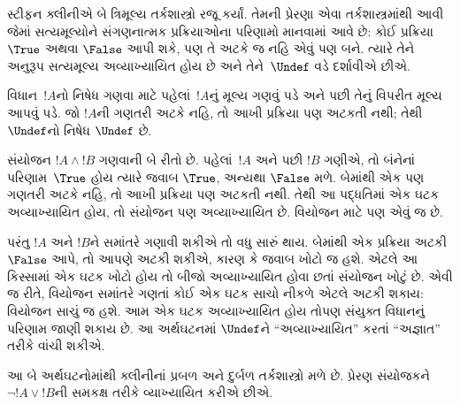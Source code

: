 \label{guunit:OLP-0395}


સ્ટીફન ક્લીનીએ બે ત્રિમૂલ્ય તર્કશાસ્ત્રો રજૂ કર્યાં. તેમની પ્રેરણા
એવા તર્કશાસ્ત્રમાંથી આવી જેમાં સત્યમૂલ્યોને સંગણનાત્મક પ્રક્રિયાઓના
પરિણામો માનવામાં આવે છે: કોઈ પ્રક્રિયા $\True$ અથવા $\False$ આપી
શકે, પણ તે અટકે જ નહિ એવું પણ બને. ત્યારે તેને અનુરૂપ સત્યમૂલ્ય
અવ્યાખ્યાયિત હોય છે અને તેને~$\Undef$ વડે દર્શાવીએ છીએ.

વિધાન~$!A$નો નિષેધ ગણવા માટે પહેલાં~$!A$નું મૂલ્ય ગણવું પડે અને
પછી તેનું વિપરીત મૂલ્ય આપવું પડે. જો $!A$ની ગણતરી અટકે નહિ, તો
આખી પ્રક્રિયા પણ અટકતી નથી; તેથી $\Undef$નો નિષેધ $\Undef$ છે.

સંયોજન $!A \land !B$ ગણવાની બે રીતો છે. પહેલાં~$!A$ અને પછી
$!B$ ગણીએ, તો બંનેનાં પરિણામ~$\True$ હોય ત્યારે જવાબ $\True$,
અન્યથા $\False$ મળે. બેમાંથી એક પણ ગણતરી અટકે નહિ, તો આખી
પ્રક્રિયા પણ અટકતી નથી. તેથી આ પદ્ધતિમાં એક ઘટક અવ્યાખ્યાયિત
હોય, તો સંયોજન પણ અવ્યાખ્યાયિત છે. વિયોજન માટે પણ એવું જ છે.

પરંતુ $!A$ અને $!B$ને સમાંતરે ગણાવી શકીએ તો વધુ સારું થાય.
બેમાંથી એક પ્રક્રિયા અટકી $\False$ આપે, તો આપણે અટકી શકીએ,
કારણ કે જવાબ ખોટો જ હશે. એટલે આ કિસ્સામાં એક ઘટક ખોટો હોય
તો બીજો અવ્યાખ્યાયિત હોવા છતાં સંયોજન ખોટું છે. એવી જ રીતે,
વિયોજન સમાંતરે ગણતાં કોઈ એક ઘટક સાચો નીકળે એટલે અટકી શકાય:
વિયોજન સાચું જ હશે. આમ એક ઘટક અવ્યાખ્યાયિત હોય તોપણ સંયુક્ત
વિધાનનું પરિણામ જાણી શકાય છે. આ અર્થઘટનમાં $\Undef$ને
``અવ્યાખ્યાયિત'' કરતાં ``અજ્ઞાત'' તરીકે વાંચી શકીએ.

આ બે અર્થઘટનોમાંથી ક્લીનીનાં પ્રબળ અને દુર્બળ તર્કશાસ્ત્રો મળે છે.
પ્રેરણ સંયોજકને $\lnot !A \lor !B$ની સમકક્ષ તરીકે વ્યાખ્યાયિત કરીએ છીએ.

